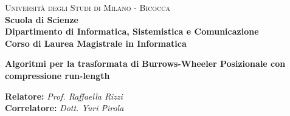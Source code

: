 \documentclass[a4paper,12pt, oneside, draft]{book}
\begin{document}
{} 
\begin{titlepage}
  

  \noindent
  \begin{minipage}[t]{0.19\textwidth}
  \end{minipage}
  \begin{minipage}[t]{0.81\textwidth}
    {
      {\textsc{Università degli Studi di Milano - Bicocca}} \\
      \textbf{Scuola di Scienze} \\
      \textbf{Dipartimento di Informatica, Sistemistica e Comunicazione} \\
      \textbf{Corso di Laurea Magistrale in Informatica} \\
      \par
    }
  \end{minipage}
  
  \vspace{40mm}
  
  \begin{center}
    {\LARGE{
        \textbf{Algoritmi per la trasformata di}}}
    \vspace{1mm}
    {\LARGE{
        \textbf{Burrows-Wheeler Posizionale con}}}
    \vspace{1mm}
    {\LARGE{
        \textbf{compressione run-length}}}
    
  \end{center}
  
  \vspace{48mm}

  \noindent
  {\large \textbf{Relatore:} \textit{Prof. Raffaella Rizzi}} \\

  \noindent
  {\large \textbf{Correlatore:} \textit{Dott. Yuri Pirola}}
  

\end{titlepage}
\end{document}
